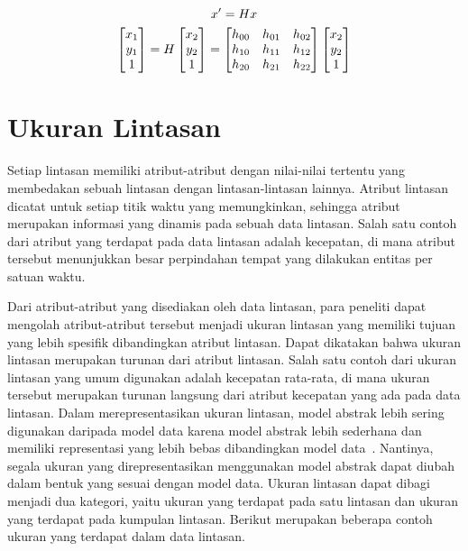 \vspace{-5pt}

\begin{gather*}
    x' = H x \\
    \begin{bmatrix}
        x_1 \\
        y_1 \\
        1
    \end{bmatrix} = H
    \begin{bmatrix}
        x_2 \\
        y_2 \\
        1
    \end{bmatrix} = 
    \begin{bmatrix}
        h\textsubscript{00} & h\textsubscript{01} & h\textsubscript{02} \\
        h\textsubscript{10} & h\textsubscript{11} & h\textsubscript{12} \\
        h\textsubscript{20} & h\textsubscript{21} & h\textsubscript{22}
    \end{bmatrix}
    \begin{bmatrix}
        x_2 \\
        y_2 \\
        1
    \end{bmatrix}
\end{gather*}

\section{Ukuran Lintasan}
\label{sec:ukuran}

Setiap lintasan memiliki atribut-atribut dengan nilai-nilai tertentu yang membedakan sebuah lintasan dengan lintasan-lintasan lainnya. Atribut lintasan dicatat untuk setiap titik waktu yang memungkinkan, sehingga atribut merupakan informasi yang dinamis pada sebuah data lintasan. Salah satu contoh dari atribut yang terdapat pada data lintasan adalah kecepatan, di mana atribut tersebut menunjukkan besar perpindahan tempat yang dilakukan entitas per satuan waktu.

Dari atribut-atribut yang disediakan oleh data lintasan, para peneliti dapat mengolah atribut-atribut tersebut menjadi ukuran lintasan yang memiliki tujuan yang lebih spesifik dibandingkan atribut lintasan. Dapat dikatakan bahwa ukuran lintasan merupakan turunan dari atribut lintasan. Salah satu contoh dari ukuran lintasan yang umum digunakan adalah kecepatan rata-rata, di mana ukuran tersebut merupakan turunan langsung dari atribut kecepatan yang ada pada data lintasan. Dalam merepresentasikan ukuran lintasan, model abstrak lebih sering digunakan daripada model data karena model abstrak lebih sederhana dan memiliki representasi yang lebih bebas dibandingkan model data~\cite{wiratma:trajectory}. Nantinya, segala ukuran yang direpresentasikan menggunakan model abstrak dapat diubah dalam bentuk yang sesuai dengan model data. Ukuran lintasan dapat dibagi menjadi dua kategori, yaitu ukuran yang terdapat pada satu lintasan dan ukuran yang terdapat pada kumpulan lintasan. Berikut merupakan beberapa contoh ukuran yang terdapat dalam data lintasan.

